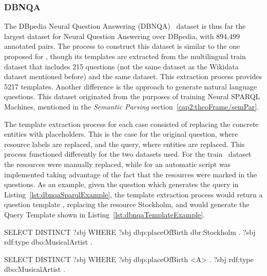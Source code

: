 \subsubsection{DBNQA}
\label{cap2:theoFrame/qakg/benchmarkDatasets/dbnqa}
The DBpedia Neural Question Answering (DBNQA)~\cite{dataset:dbnqa-hartmann-marx-soru-2018} dataset 
is thus far the largest dataset for Neural Question Answering over DBpedia, with 894,499 annotated 
pairs. The process to construct this dataset is similar to the one proposed for \LCQuADone{}, though its 
templates are extracted from the multilingual \QALDseven{} train dataset that includes 215 questions 
(not the same dataset as the Wikidata \QALDseven{} dataset mentioned before) and the same \LCQuADone 
dataset. This extraction process provides 5217 \SPARQL{} templates. Another difference is the 
approach to generate natural language questions. This dataset originated from the purposes of 
training Neural SPARQL Machines, mentioned in the \textit{Semantic Parsing} section~\ref{cap2:theoFrame/semPar}.

The template extraction process for each case consisted of replacing the concrete entities 
with placeholders. This is the case for the original question, where resource labels are 
replaced, and the query, where entities are replaced. This process functioned differently for 
the two datasets used. For the \QALDseven{} train~\cite{dataset:qald7-UsbeckNHKRN17} dataset the 
resources were manually replaced, while for \LCQuADone{} an automatic script was implemented taking 
advantage of the fact that the resources were marked in the questions. As an example, given the 
question  which generates the query 
in Listing~\ref{lst:dbnqaSparqlExample}, the template extraction process would return a 
question template , replacing the 
resource Stockholm, and would generate the Query Template shown in Listing~\ref{lst:dbnqaTemplateExample}.

\begin{sparqlcode}[%
    caption={\SPARQL{} query for the question: \dquotesit{What are the artists that are born in Stockholm?}.}, 
    label={lst:dbnqaSparqlExample}]
SELECT DISTINCT ?sbj WHERE {
    ?sbj dbp:placeOfBirth dbr:Stockholm .
    ?sbj rdf:type dbo:MusicalArtist .
}
\end{sparqlcode}

\begin{sparqlcode}[%
    caption={Query Template for the question: \dquotesit{What are the artists that are born in <A>?}.}, 
    label={lst:dbnqaTemplateExample}]
SELECT DISTINCT ?sbj WHERE {
    ?sbj dbp:placeOfBirth <A> .
    ?sbj rdf:type dbo:MusicalArtist .
}
\end{sparqlcode}

